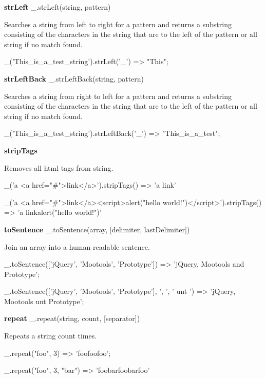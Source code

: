 {\bfseries str\+Left} \+\_\+.\+str\+Left(string, pattern)

Searches a string from left to right for a pattern and returns a substring consisting of the characters in the string that are to the left of the pattern or all string if no match found.


\begin{DoxyCode}
\_('This\_is\_a\_test\_string').strLeft('\_')
=> "This";
\end{DoxyCode}


{\bfseries str\+Left\+Back} \+\_\+.\+str\+Left\+Back(string, pattern)

Searches a string from right to left for a pattern and returns a substring consisting of the characters in the string that are to the left of the pattern or all string if no match found.


\begin{DoxyCode}
\_('This\_is\_a\_test\_string').strLeftBack('\_')
=> "This\_is\_a\_test";
\end{DoxyCode}


{\bfseries strip\+Tags}

Removes all html tags from string.


\begin{DoxyCode}
\_('a <a href="#">link</a>').stripTags()
=> 'a link'

\_('a <a href="#">link</a><script>alert("hello world!")</script>').stripTags()
=> 'a linkalert("hello world!")'
\end{DoxyCode}


{\bfseries to\+Sentence} \+\_\+.\+to\+Sentence(array, \mbox{[}delimiter, last\+Delimiter\mbox{]})

Join an array into a human readable sentence.


\begin{DoxyCode}
\_.toSentence(['jQuery', 'Mootools', 'Prototype'])
=> 'jQuery, Mootools and Prototype';

\_.toSentence(['jQuery', 'Mootools', 'Prototype'], ', ', ' unt ')
=> 'jQuery, Mootools unt Prototype';
\end{DoxyCode}


{\bfseries repeat} \+\_\+.\+repeat(string, count, \mbox{[}separator\mbox{]})

Repeats a string count times.


\begin{DoxyCode}
\_.repeat("foo", 3)
=> 'foofoofoo';

\_.repeat("foo", 3, "bar")
=> 'foobarfoobarfoo'
\end{DoxyCode}


